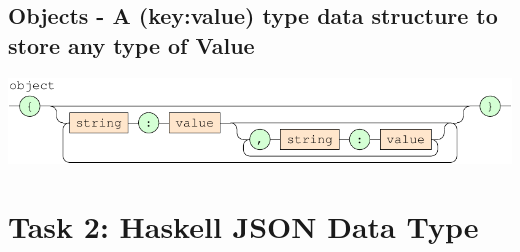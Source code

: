 \documentclass[a4paper]{article}
\begin{document}
\subsection*{Objects - A (key:value) type data structure to store any type of Value }

{\centering

   \includegraphics[scale=0.9]{EBNF/object}

}




\section{Task 2: Haskell JSON Data Type}
\end{document}
